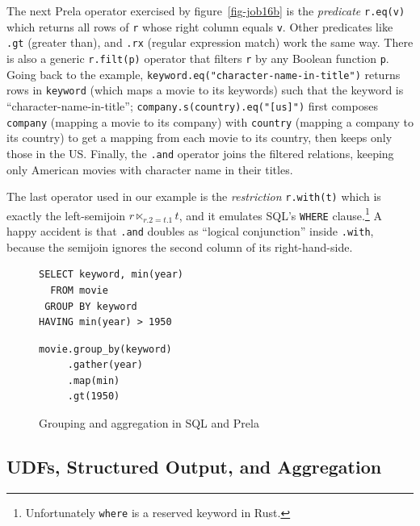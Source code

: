 \documentclass[sigconf,screen,pbalance]{cidr-2027}
\newcommand{\code}{\lstinline[style=prela]}
\newcommand{\sql}{\lstinline[style=sql]}
\begin{document}
The next Prela operator exercised by figure~\ref{fig-job16b} is the \emph{predicate} \code|r.eq(v)| which returns all rows of \code|r| whose right column equals \code|v|.
Other predicates like \code|.gt| (greater than), and \code|.rx| (regular expression match) work the same way.
There is also a generic \code|r.filt(p)| operator that filters \code|r| by any Boolean function \code|p|.
Going back to the example, \code|keyword.eq("character-name-in-title")| returns rows in \code|keyword| (which maps a movie to its keywords) such that the keyword is ``character-name-in-title''; \code|company.s(country).eq("[us]")| first composes \code|company| (mapping a movie to its company) with \code|country| (mapping a company to its country) to get a mapping from each movie to its country, then keeps only those in the US.
Finally, the \code|.and| operator joins the filtered relations, keeping only American movies with character name in their titles.

The last operator used in our example is the \emph{restriction} \code|r.with(t)| which is exactly the left-semijoin $r \ltimes_{r.2 = t.1} t$, and it emulates SQL's \sql|WHERE| clause.\footnote{Unfortunately \texttt{where} is a reserved keyword in Rust.}
A happy accident is that \code|.and| doubles as ``logical conjunction'' inside \code|.with|, because the semijoin ignores the second column of its right-hand-side.

\begin{figure}
\begin{minipage}[t]{0.55\linewidth}
\begin{lstlisting}[style=sql]
SELECT keyword, min(year)
  FROM movie
 GROUP BY keyword
HAVING min(year) > 1950
\end{lstlisting}
\end{minipage}%
\begin{minipage}[t]{0.45\linewidth}
\begin{lstlisting}
movie.group_by(keyword)
     .gather(year)
     .map(min)
     .gt(1950)
\end{lstlisting}
\end{minipage}
\caption{Grouping and aggregation in SQL and Prela}
\label{fig-grouping}
\end{figure}

\subsection{UDFs, Structured Output, and Aggregation}\label{subsec-grouping}
\end{document}
